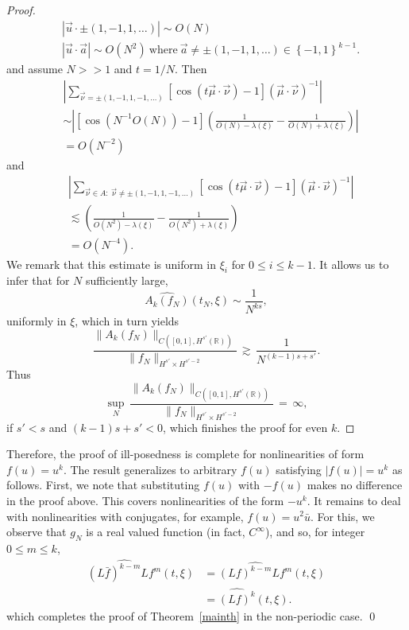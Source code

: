 \documentclass{amsart}
\newcommand{\wh}{\widehat}
\begin{document}
\begin{proof}
\begin{equation*}
\begin{split}
& | \vec{u} \cdot \pm (1, -1, 1, \dots) | \sim O(N)
\\
& | \vec{u} \cdot \vec{a} | \sim O(N^{2}) \ \text{where} \ \vec{a} \neq \pm(1, -1, 1, \dots) \in \left \{ -1,1 \right \}^{k-1}.
\end{split}
\end{equation*}
and assume $N >>1$ and $t = 1/{N}$. Then 
\begin{equation*}
\begin{split}
 & | \sum_{\vec{\nu} = \pm (1, -1, 1, -1, \dots)}  [\cos(t \vec{\mu} \cdot \vec{\nu})-1] (\vec{\mu} \cdot \vec{\nu})^{-1} |
\\
& \sim 
\left | [\cos(N^{-1} O(N)) -1 ]
\left ( \frac{1}{O(N) - \lambda(\xi)} - \frac{1}{O(N)+ \lambda(\xi)} \right ) \right |
\\
& = O(N^{-2})
\end{split}
\end{equation*}
and
\begin{equation*}
\begin{split}
  & | \sum_{\vec{\nu} \in A: \ \vec{\nu} \neq \pm(1, -1, 1, -1,\dots)}  [\cos(t \vec{\mu} \cdot \vec{\nu})-1] (\vec{\mu} \cdot \vec{\nu})^{-1} |
\\
& \lesssim
\left ( \frac{1}{O(N^{2}) - \lambda(\xi)} - \frac{1}{O(N^{2})+ \lambda(\xi)} \right )
\\
& = O(N^{-4}).
\end{split}
\end{equation*}
We remark that this estimate is uniform in $\xi_{i}$ for $0 \le i \le k-1$.
It allows us to infer that for $N$ sufficiently large,
\[
\widehat{A_{k}(f_N)}(t_N,\xi) \sim \frac{1}{N^{ks}},
\]
uniformly in $\xi$, which in turn yields
\[
\frac{\|A_{k}(f_N)\|_{C([0,1], H^{s'}(\mathbb{R}))}}{\|f_N\|_{H^{s'}\times H^{s'-2}}}\,\gtrsim\, \frac{1}{N^{(k-1)s+s'}}.\]
Thus
\[
\sup_N\,\frac{\|A_{k}(f_N)\|_{C([0,1], H^{s'}(\mathbb{R}))}}{\|f_N\|_{H^{s'}\times H^{s'-2}}}\,=\,\infty,\]
if $s'<s$ and $(k-1)s+s'<0$, which finishes the proof for even $k$. 
\end{proof}
Therefore, the proof of ill-posedness is complete for nonlinearities of form $f(u) = u^{k}$. The result generalizes to arbitrary $f(u)$ satisfying $| f(u) | = u^{k}$ as follows. First, we note that substituting $f(u)$ with $-f(u)$ makes no difference in the proof above. This covers nonlinearities of the form $-u^{k}$. It remains to deal with nonlinearities with conjugates, for example, $f(u) = u^{2}\bar{u}$. For this, we observe that $g_{N}$ is a real valued function (in fact, $C^{\infty}$), and so, for integer $0 \le m \le k$,
\begin{equation*}
\begin{split}
  \wh{(L \bar{f})^{k-m}Lf^{m}}(t, \xi)
 & =
\wh{(L f)^{k-m}Lf^{m}}(t, \xi)
\\
& = \wh{(Lf)^{k}}(t, \xi).
  \end{split}
\end{equation*}
which completes the proof of Theorem~\ref{mainth} in the non-periodic case. \qed
\end{document}
